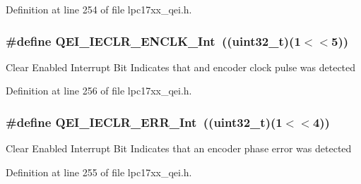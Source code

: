 \-Definition at line 254 of file lpc17xx\-\_\-qei.\-h.

\hypertarget{group___q_e_i___private___macros_ga5c14ebd1171a97054d0f89420629a060}{
\subsubsection[{\-Q\-E\-I\-\_\-\-I\-E\-C\-L\-R\-\_\-\-E\-N\-C\-L\-K\-\_\-\-Int}]{\setlength{\rightskip}{0pt plus 5cm}\#define {\bf \-Q\-E\-I\-\_\-\-I\-E\-C\-L\-R\-\_\-\-E\-N\-C\-L\-K\-\_\-\-Int}~((uint32\-\_\-t)(1$<$$<$5))}}\label{group___q_e_i___private___macros_ga5c14ebd1171a97054d0f89420629a060}
\-Clear \-Enabled \-Interrupt \-Bit \-Indicates that and encoder clock pulse was detected 

\-Definition at line 256 of file lpc17xx\-\_\-qei.\-h.

\hypertarget{group___q_e_i___private___macros_ga0a5f142c339c32438784d3c8691f75f3}{
\subsubsection[{\-Q\-E\-I\-\_\-\-I\-E\-C\-L\-R\-\_\-\-E\-R\-R\-\_\-\-Int}]{\setlength{\rightskip}{0pt plus 5cm}\#define {\bf \-Q\-E\-I\-\_\-\-I\-E\-C\-L\-R\-\_\-\-E\-R\-R\-\_\-\-Int}~((uint32\-\_\-t)(1$<$$<$4))}}\label{group___q_e_i___private___macros_ga0a5f142c339c32438784d3c8691f75f3}
\-Clear \-Enabled \-Interrupt \-Bit \-Indicates that an encoder phase error was detected 

\-Definition at line 255 of file lpc17xx\-\_\-qei.\-h.

